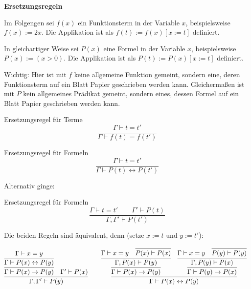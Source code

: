 \documentclass[8pt]{beamer}
\newcommand{\strong}[1]{\textsf{\textbf{#1}}}
\newcommand{\centerheadline}[1]{%
  \begin{center}\strong{#1}\end{center}}
\newcommand{\parspace}{\vspace{0.8em}}
\newcommand{\cond}{\rightarrow}
\newcommand{\bicond}{\leftrightarrow}
\begin{document}
\begin{frame}
\centerheadline{Ersetzungsregeln}
\end{frame}

\begin{frame}
Im Folgengen sei $f(x)$ ein Funktionsterm in der Variable $x$,
beispielsweise $f(x):=2x$. Die Applikation ist als $f(t):=f(x)[x:=t]$
definiert.\pause

\parspace
In gleichartiger Weise sei $P(x)$ eine Formel in der Variable $x$,
beispielsweise $P(x):=(x>0)$. Die Applikation ist als $P(t):=P(x)[x:=t]$
definiert.\pause

\parspace
Wichtig: Hier ist mit $f$ keine allgemeine Funktion gemeint, sondern
eine, deren Funktionsterm auf ein Blatt Papier geschrieben werden kann.
Gleichermaßen ist mit $P$ kein allgemeines Prädikat gemeint, sondern
eines, dessen Formel auf ein Blatt Papier geschrieben werden kann.
\end{frame}

\begin{frame}
\begin{block}{Ersetzungsregel für Terme}
\[\dfrac{\Gamma\vdash t=t'}{\Gamma\vdash f(t)=f(t')}\]
\end{block}
\end{frame}

\begin{frame}
\begin{block}{Ersetzungsregel für Formeln}
\[\dfrac{\Gamma\vdash t=t'}{\Gamma\vdash P(t)\bicond P(t')}\]
\end{block}\pause
Alternativ ginge:
\begin{block}{Ersetzungsregel für Formeln}
\[\dfrac{\Gamma\vdash t=t'\qquad\Gamma'\vdash P(t)}{\Gamma,\Gamma'\vdash P(t')}\]
\end{block}\pause
Die beiden Regeln sind äquivalent, denn (setze $x:=t$ und $y:=t'$):
\begin{small}
\[
\begin{array}{@{}l@{\qquad}l}
\infer{\Gamma,\Gamma'\vdash P(y)}{
  \infer{\Gamma\vdash P(x)\cond P(y)}{
    \infer{\Gamma\vdash P(x)\bicond P(y)}{\Gamma\vdash x=y}}
& \Gamma'\vdash P(x)}
&
\infer{\Gamma\vdash P(x)\bicond P(y)}{
  \infer{\Gamma\vdash P(x)\cond P(y)}{
    \infer{\Gamma, P(x)\vdash P(y)}{
      \Gamma\vdash x=y & \infer{P(x)\vdash P(x)}{}}}
& \infer{\Gamma\vdash P(y)\cond P(x)}{
    \infer{\Gamma,P(y)\vdash P(x)}{
      \Gamma\vdash x=y & \infer{P(y)\vdash P(y)}{}}}}
\end{array}
\]
\end{small}
\end{frame}
\end{document}
